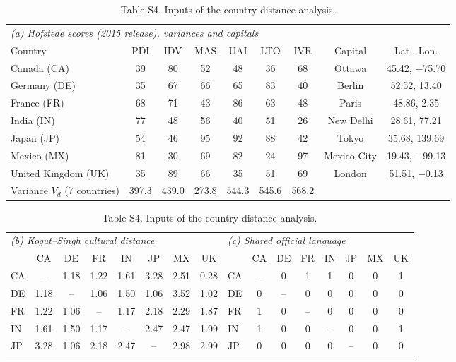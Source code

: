 \begin{table}[H]
\caption{Table S4. Inputs of the country-distance analysis.}
\centering\scriptsize\setlength{\tabcolsep}{3.2pt}
\begin{tabular}{lcccccccc}
\toprule
\multicolumn{9}{l}{\textit{(a) Hofstede scores (2015 release), variances and capitals}} \\
Country & PDI & IDV & MAS & UAI & LTO & IVR & Capital & Lat., Lon. \\
\midrule
Canada (CA) & 39 & 80 & 52 & 48 & 36 & 68 & Ottawa & 45.42, $-$75.70 \\
Germany (DE) & 35 & 67 & 66 & 65 & 83 & 40 & Berlin & 52.52, 13.40 \\
France (FR) & 68 & 71 & 43 & 86 & 63 & 48 & Paris & 48.86, 2.35 \\
India (IN) & 77 & 48 & 56 & 40 & 51 & 26 & New Delhi & 28.61, 77.21 \\
Japan (JP) & 54 & 46 & 95 & 92 & 88 & 42 & Tokyo & 35.68, 139.69 \\
Mexico (MX) & 81 & 30 & 69 & 82 & 24 & 97 & Mexico City & 19.43, $-$99.13 \\
United Kingdom (UK) & 35 & 89 & 66 & 35 & 51 & 69 & London & 51.51, $-$0.13 \\
Variance $V_d$ (7 countries) & 397.3 & 439.0 & 273.8 & 544.3 & 545.6 & 568.2 & & \\
\bottomrule
\end{tabular}\par\vspace{4pt}
\begin{tabular}{lccccccc@{\hspace{14pt}}lccccccc}
\toprule
\multicolumn{8}{l}{\textit{(b) Kogut--Singh cultural distance}} & \multicolumn{8}{l}{\textit{(c) Shared official language}} \\
 & CA & DE & FR & IN & JP & MX & UK &  & CA & DE & FR & IN & JP & MX & UK \\
\midrule
CA & -- & 1.18 & 1.22 & 1.61 & 3.28 & 2.51 & 0.28 & CA & -- & 0 & 1 & 1 & 0 & 0 & 1 \\
DE & 1.18 & -- & 1.06 & 1.50 & 1.06 & 3.52 & 1.02 & DE & 0 & -- & 0 & 0 & 0 & 0 & 0 \\
FR & 1.22 & 1.06 & -- & 1.17 & 2.18 & 2.29 & 1.87 & FR & 1 & 0 & -- & 0 & 0 & 0 & 0 \\
IN & 1.61 & 1.50 & 1.17 & -- & 2.47 & 2.47 & 1.99 & IN & 1 & 0 & 0 & -- & 0 & 0 & 1 \\
JP & 3.28 & 1.06 & 2.18 & 2.47 & -- & 2.98 & 2.99 & JP & 0 & 0 & 0 & 0 & -- & 0 & 0 \\

\end{tabular}
\end{table}
